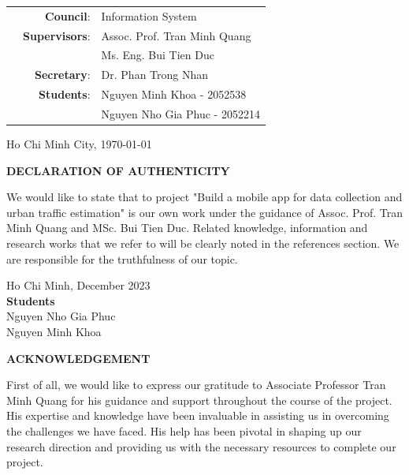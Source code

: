 \documentclass[a4paper]{article}
\begin{document}
\begin{titlepage}
\begin{center}
\begin{table}[h]
    \large
    \begin{tabular}{r r l}
    \hspace{4 cm} & \textbf{Council}: & Information System \\
    & \textbf{Supervisors}: & Assoc. Prof. Tran Minh Quang \\ 
    & & Ms. Eng. Bui Tien Duc\\
    & \textbf{Secretary}: & Dr. Phan Trong Nhan \\
    & \textbf{Students}: & Nguyen Minh Khoa - 2052538\\
    & & Nguyen Nho Gia Phuc - 2052214 \\
    \end{tabular}
\end{table}
\vspace{2cm}

{Ho Chi Minh City, \today}
\end{center}
\end{titlepage}

\begin{center}
    \Large{\textbf{DECLARATION OF AUTHENTICITY}}
\end{center}
We would like to state that to project "Build a mobile app for data collection and urban traffic estimation" is our own work under the guidance of Assoc. Prof. Tran Minh Quang and MSc. Bui Tien Duc. Related knowledge, information and research works that we refer to will be clearly noted in the references section.
We are responsible for the truthfulness of our topic.

\begin{flushright}
    Ho Chi Minh, December 2023 \\
    \textbf{Students} \\
    Nguyen Nho Gia Phuc \\
    Nguyen Minh Khoa
\end{flushright}


\newpage
\begin{center}
    \Large{\textbf{ACKNOWLEDGEMENT}}
\end{center}

First of all, we would like to express our gratitude to Associate Professor Tran Minh Quang for his guidance and support throughout the course of the project. His expertise and knowledge have been invaluable in assisting us in overcoming the challenges we have faced. His help has been pivotal in shaping up our research direction and providing us with the necessary resources to complete our project. 
\end{document}
